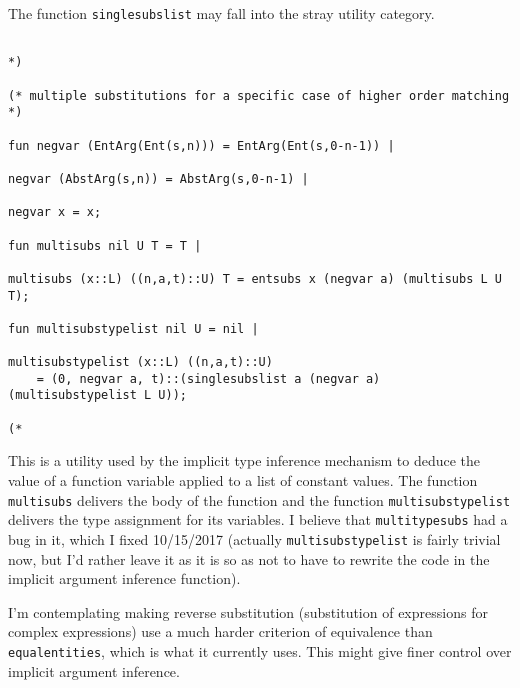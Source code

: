 \documentclass{article}
\begin{document}
The function {\tt singlesubslist} may fall into the stray utility category.

\begin{verbatim}

*)

(* multiple substitutions for a specific case of higher order matching *)

fun negvar (EntArg(Ent(s,n))) = EntArg(Ent(s,0-n-1)) |

negvar (AbstArg(s,n)) = AbstArg(s,0-n-1) |

negvar x = x;

fun multisubs nil U T = T |

multisubs (x::L) ((n,a,t)::U) T = entsubs x (negvar a) (multisubs L U T);

fun multisubstypelist nil U = nil |

multisubstypelist (x::L) ((n,a,t)::U) 
    = (0, negvar a, t)::(singlesubslist a (negvar a) (multisubstypelist L U));

(*

\end{verbatim}

This is a utility used by the implicit type inference mechanism to deduce the value of a function variable applied to a list of constant values.
The function {\tt multisubs} delivers the body of the function and the function {\tt multisubstypelist} delivers the type assignment for its variables.
I believe that {\tt multitypesubs} had a bug in it, which I fixed 10/15/2017 (actually {\tt multisubstypelist} is fairly trivial now, but I'd rather leave
it as it is so as not to have to rewrite the code in the implicit argument inference function).

I'm contemplating making reverse substitution (substitution of expressions for complex expressions) use a much harder criterion of equivalence than {\tt equalentities}, which is what it currently uses.  This might give finer control over implicit argument inference.
\end{document}
